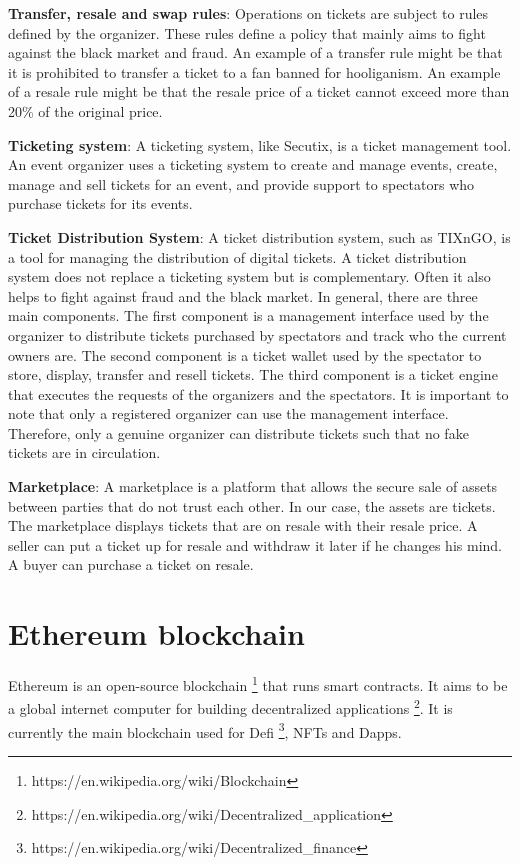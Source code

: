 \documentclass[a4paper,11pt,oneside]{report}
\begin{document}
\begin{description}
    \item \textbf{Transfer, resale and swap rules}: Operations on tickets are subject to rules defined by the organizer. These rules define a policy that mainly aims to fight against the black market and fraud. An example of a transfer rule might be that it is prohibited to transfer a ticket to a fan banned for hooliganism. An example of a resale rule might be that the resale price of a ticket cannot exceed more than 20\% of the original price.
    \item \textbf{Ticketing system}: A ticketing system, like Secutix, is a ticket management tool. An event organizer uses a ticketing system to create and manage events, create, manage and sell tickets for an event, and provide support to spectators who purchase tickets for its events.
    \item \textbf{Ticket Distribution System}: A ticket distribution system, such as TIXnGO, is a tool for managing the distribution of digital tickets. A ticket distribution system does not replace a ticketing system but is complementary. Often it also helps to fight against fraud and the black market. In general, there are three main components. The first component is a management interface used by the organizer to distribute tickets purchased by spectators and track who the current owners are. The second component is a ticket wallet used by the spectator to store, display, transfer and resell tickets. The third component is a ticket engine that executes the requests of the organizers and the spectators. It is important to note that only a registered organizer can use the management interface. Therefore, only a genuine organizer can distribute tickets such that no fake tickets are in circulation.
    \item \textbf{Marketplace}: A marketplace is a platform that allows the secure sale of assets between parties that do not trust each other. In our case, the assets are tickets. The marketplace displays tickets that are on resale with their resale price. A seller can put a ticket up for resale and withdraw it later if he changes his mind. A buyer can purchase a ticket on resale.
\end{description}

\section{Ethereum blockchain}
Ethereum is an open-source blockchain \footnote{https://en.wikipedia.org/wiki/Blockchain} that runs smart contracts. It aims to be a global internet computer for building decentralized applications \footnote{https://en.wikipedia.org/wiki/Decentralized\_application}. It is currently the main blockchain used for Defi \footnote{https://en.wikipedia.org/wiki/Decentralized\_finance}, NFTs and Dapps.
\end{document}
